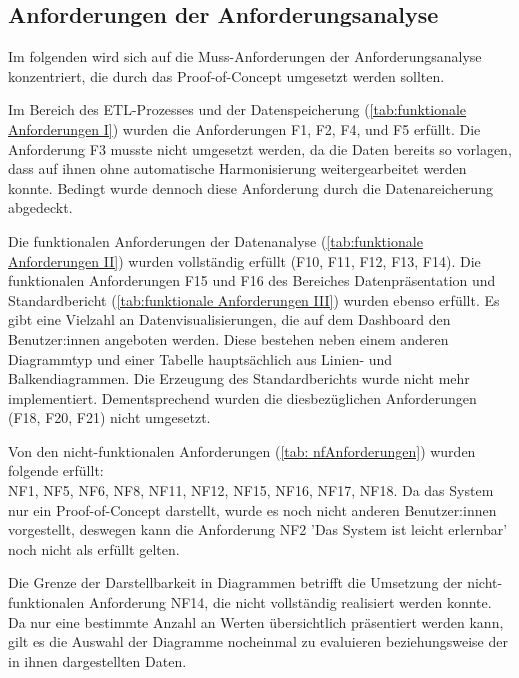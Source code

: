 \clearpage
\subsection{Anforderungen der Anforderungsanalyse}
Im folgenden wird sich auf die Muss-Anforderungen der Anforderungsanalyse konzentriert, die durch das Proof-of-Concept
umgesetzt werden sollten. 

Im Bereich des ETL-Prozesses und der Datenspeicherung (\autoref{tab:funktionale Anforderungen I}) wurden die Anforderungen F1, F2, F4, und F5 erfüllt.
Die Anforderung F3 musste nicht umgesetzt werden, da die Daten bereits so vorlagen, dass auf ihnen ohne automatische Harmonisierung weitergearbeitet werden konnte.
Bedingt wurde dennoch diese Anforderung durch die Datenareicherung abgedeckt.

Die funktionalen Anforderungen der Datenanalyse (\autoref{tab:funktionale Anforderungen II}) wurden vollständig erfüllt (F10, F11, F12, F13, F14).
Die funktionalen Anforderungen F15 und F16 des Bereiches Datenpräsentation und Standardbericht (\autoref{tab:funktionale Anforderungen III}) 
wurden ebenso erfüllt. Es gibt eine Vielzahl an Datenvisualisierungen, die auf dem Dashboard den Benutzer:innen angeboten werden. 
Diese bestehen neben einem anderen Diagrammtyp und einer Tabelle hauptsächlich aus Linien- und Balkendiagrammen.
Die Erzeugung des Standardberichts wurde nicht mehr implementiert. Dementsprechend wurden die diesbezüglichen
Anforderungen (F18, F20, F21) nicht umgesetzt. 

Von den nicht-funktionalen Anforderungen (\autoref{tab: nfAnforderungen}) wurden folgende erfüllt:\\
NF1, NF5, NF6, NF8, NF11, NF12, NF15, NF16, NF17, NF18. 
Da das System nur ein Proof-of-Concept darstellt, wurde es noch nicht anderen
Benutzer:innen vorgestellt, deswegen kann die Anforderung NF2 'Das System ist leicht erlernbar' noch nicht als erfüllt gelten.

Die Grenze der Darstellbarkeit in Diagrammen betrifft die Umsetzung der nicht-funktionalen Anforderung NF14, die nicht vollständig
realisiert werden konnte. Da nur eine bestimmte Anzahl an Werten übersichtlich präsentiert werden kann, gilt es die Auswahl der Diagramme
nocheinmal zu evaluieren beziehungsweise der in ihnen dargestellten Daten. 


